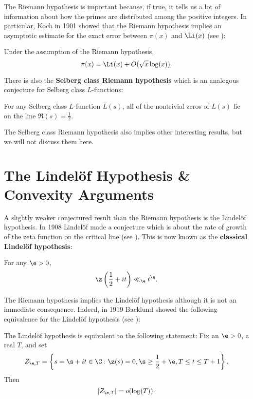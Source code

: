       The Riemann hypothesis is important because, if true, it tells us a lot of information about how the primes are distributed among the positive integers. In particular, Koch in 1901 showed that the Riemann hypothesis implies an asymptotic estimate for the exact error between $\pi(x)$ and $\Li(x)$ (see \cite{von1901distribution}):

      \begin{proposition}
        Under the assumption of the Riemann hypothesis,
        \[
          \pi(x) = \Li(x)+O(\sqrt{x}\log(x)).
        \]
      \end{proposition}

      There is also the \textbf{Selberg class Riemann hypothesis} which is an analogous conjecture for Selberg class $L$-functions:

      \begin{conjecture}
        For any Selberg class $L$-function $L(s)$, all of the nontrivial zeros of $L(s)$ lie on the line $\Re(s) = \frac{1}{2}$.
      \end{conjecture}

      The Selberg class Riemann hypothesis also implies other interesting results, but we will not discuss them here.
  \section{The Lindel\"of Hypothesis \& Convexity Arguments}
    A slightly weaker conjectured result than the Riemann hypothesis is the Lindel\"of hypothesis. In 1908 Lindel\"of made a conjecture which is about the rate of growth of the zeta function on the critical line (see \cite{lindelof1908quelques}). This is now known as the \textbf{classical Lindel\"of hypothesis}:

    \begin{conjecture}
      For any $\e > 0$,
      \[
        \z\left(\frac{1}{2}+it\right) \ll_{\e} t^{\e}.
      \]
    \end{conjecture}

    The Riemann hypothesis implies the Lindel\"of hypothesis although it is not an immediate consequence. Indeed, in 1919 Backlund showed the following equivalence for the Lindel\"of hypothesis (see \cite{backlund1919beziehung}):

    \begin{proposition}\label{prop:Lindelof_hypothesis_equivalence}
      The Lindel\"of hypothesis is equivalent to the following statement: Fix an $\e > 0$, a real $T$, and set
      \[
        Z_{\e,T} = \left\{s = \s+it \in \C : \z(s) = 0, \s \ge \frac{1}{2}+\e, T \le t \le T+1 \right\}.
      \]
      Then
      \[
        |Z_{\e,T}| = o(\log(T)).
      \]
    \end{proposition}

